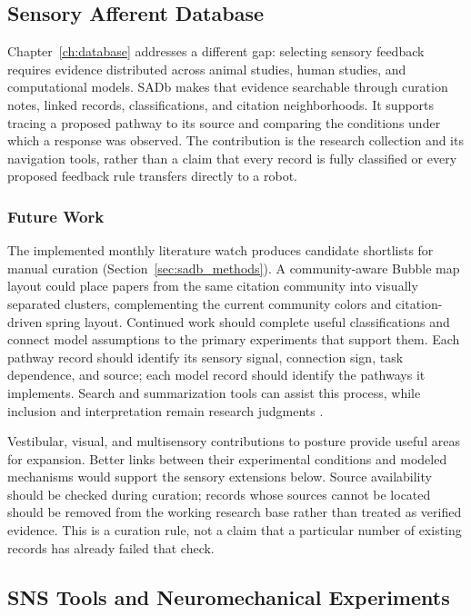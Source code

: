 \subsection{Sensory Afferent Database}

Chapter~\ref{ch:database} addresses a different gap: selecting sensory feedback requires evidence distributed across animal studies, human studies, and computational models. SADb makes that evidence searchable through curation notes, linked records, classifications, and citation neighborhoods. It supports tracing a proposed pathway to its source and comparing the conditions under which a response was observed. The contribution is the research collection and its navigation tools, rather than a claim that every record is fully classified or every proposed feedback rule transfers directly to a robot.

\subsubsection{Future Work}\label{sec:fw_database}

The implemented monthly literature watch produces candidate shortlists for manual curation (Section~\ref{sec:sadb_methods}). A community-aware Bubble map layout could place papers from the same citation community into visually separated clusters, complementing the current community colors and citation-driven spring layout. Continued work should complete useful classifications and connect model assumptions to the primary experiments that support them. Each pathway record should identify its sensory signal, connection sign, task dependence, and source; each model record should identify the pathways it implements. Search and summarization tools can assist this process, while inclusion and interpretation remain research judgments \citep{bolen_using_2024}.

Vestibular, visual, and multisensory contributions to posture provide useful areas for expansion. Better links between their experimental conditions and modeled mechanisms would support the sensory extensions below. Source availability should be checked during curation; records whose sources cannot be located should be removed from the working research base rather than treated as verified evidence. This is a curation rule, not a claim that a particular number of existing records has already failed that check.

\subsection{SNS Tools and Neuromechanical Experiments}

